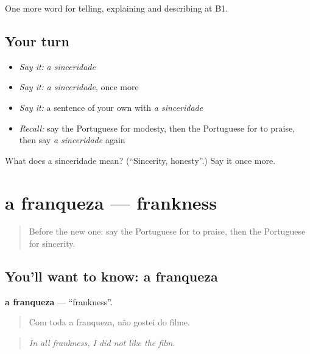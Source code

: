 \begin{grammarlens}[title={What you've built}]
One more word for telling, explaining and describing at B1.
\end{grammarlens}

\subsection*{Your turn}
\begin{itemize}
\raggedright
  \item \emph{Say it:} \emph{a sinceridade}
  \item \emph{Say it:} \emph{a sinceridade}, once more
  \item \emph{Say it:} a sentence of your own with \emph{a sinceridade}
  \item \emph{Recall:} say the Portuguese for modesty, then the Portuguese for to praise, then say \emph{a sinceridade} again
\end{itemize}

\begin{tcolorbox}[breakable,colback=teal!4,colframe=teal!35!black,title={Before you move on}]
What does a sinceridade mean? (\textquotedblleft{}Sincerity, honesty\textquotedblright{}.) Say it once more.
\end{tcolorbox}
\section[a franqueza]{a franqueza — frankness}

\label{lesson:PT-C471-franqueza}



\begin{quote}
Before the new one: say the Portuguese for to praise, then the Portuguese for sincerity.
\end{quote}

\subsection*{You'll want to know: a franqueza}
\textbf{a franqueza} — \textquotedblleft{}frankness\textquotedblright{}.

\begin{quote}
Com toda a franqueza, não gostei do filme.
\end{quote}

\begin{quote}
\emph{In all frankness, I did not like the film.}
\end{quote}

